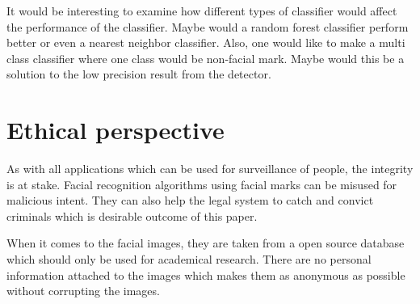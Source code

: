 It would be interesting to examine how different types of classifier would affect the performance of the classifier. Maybe would a random forest classifier perform better or even a nearest neighbor classifier. Also, one would like to make a multi class classifier where one class would be non-facial mark. Maybe would this be a solution to the low precision result from the detector.  

\section{Ethical perspective}

As with all applications which can be used for surveillance of people, the integrity is at stake. Facial recognition algorithms using facial marks can be misused for malicious intent. They can also help the legal system to catch and convict criminals which is desirable outcome of this paper. 

When it comes to the facial images, they are taken from a open source database which should only be used for academical research. There are no personal information attached to the images which makes them as anonymous as possible without corrupting the images.    